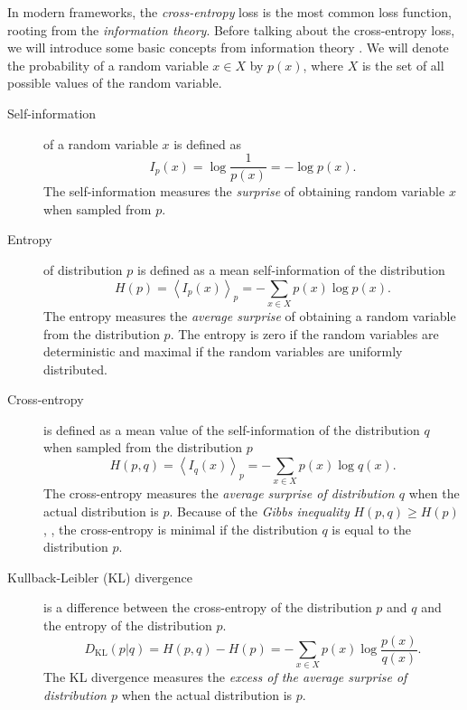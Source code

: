 In modern \dl frameworks, the \emph{cross-entropy} loss is the most common loss function, rooting from the \emph{information theory}.
Before talking about the cross-entropy loss, we will introduce some basic concepts from information theory \cite{shannon}.
We will denote the probability of a random variable $x \in X$ by $p(x)$, where $X$ is the set of all possible values of the random variable.
\begin{description}
    \item [Self-information] of a random variable $x$ is defined as
    \begin{equation}
        I_p(x) = \log \frac{1}{p(x)} =- \log p(x).
    \end{equation}
    The self-information measures the \emph{surprise} of obtaining random variable $x$ when sampled from $p$.
    \item[Entropy] of distribution $p$ is defined as a mean self-information of the distribution
    \begin{equation}
        H(p) = \left< I_p(x)\right>_p = - \sum_{x \in X} p(x) \log p(x).
    \end{equation}
    The entropy measures the \emph{average surprise} of obtaining a random variable from the distribution $p$.
    The entropy is zero if the random variables are deterministic and maximal if the random variables are uniformly distributed.
    \item[Cross-entropy] is defined as a mean value of the self-information of the distribution $q$ when sampled from the distribution $p$
    \begin{equation}
        H(p,q) = \left< I_q(x)\right>_p = - \sum_{x \in X} p(x) \log q(x).
    \end{equation}
    The cross-entropy measures the \emph{average surprise of distribution $q$} when the actual distribution is $p$.
    Because of the \emph{Gibbs inequality} $H(p,q) \geq H(p)$, \cite{information_theory}, the cross-entropy is minimal if the distribution $q$ is equal to the distribution $p$.
    \item[Kullback-Leibler (KL) divergence] is a difference between the cross-entropy of the distribution $p$ and $q$ and the entropy of the distribution $p$.
    \begin{equation}
        D_{\text{KL}}(p|q) =  H(p,q) - H(p) = - \sum_{x \in X} p(x) \log \frac{p(x)}{q(x)}.
    \end{equation}
    The KL divergence measures the \emph{excess of the average surprise of distribution $p$} when the actual distribution is $p$.
\end{description} 

